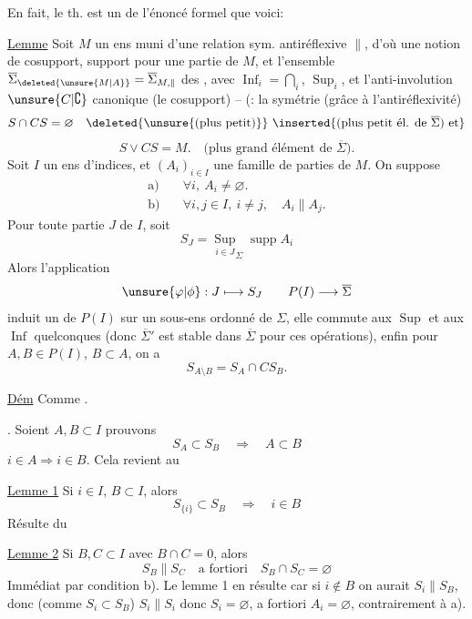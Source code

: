 En fait, le th. est un   de l'énoncé formel que voici:

\uline{Lemme} Soit $M$ un ens muni d'une relation sym. antiréflexive $\parallel$, d'où une notion de cosupport, support pour une partie de $M$, et l'ensemble $\overline\Sigma_{\deleted{\unsure{M|A}}}=\overline\Sigma_{M,\parallel}$ des , avec $\operatorname{Inf}_i=\bigcap_i$, $\operatorname{Sup}_i$, et l'anti-involution $\unsure{C|\complement}$ canonique (le cosupport) -- (: la symétrie   (grâce à l'antiréflexivité)
\[
S\cap CS=\varnothing\quad\deleted{\text{\unsure{(plus petit)}}}\ \inserted{\text{(plus petit él. de }\overline\Sigma\text{) et}}
\]
\[
S\vee CS=M.\quad\text{(plus grand élément de }\overline\Sigma\text{)}.
\]
Soit $I$ un ens d'indices, et $(A_i)_{i\in I}$ une famille de parties de $M$.  On suppose
\[
\begin{aligned}
\text{a)}\quad&\forall i,\ A_i\ne\varnothing.\\
\text{b)}\quad&\forall i,j\in I,\ i\ne j,\quad A_i\parallel A_j.
\end{aligned}
\]
Pour toute partie $J$ de $I$, soit
\[
S_J=\underset{i\in J}{\operatorname{Sup}}_{\Sigma}\operatorname{supp}A_i
\]
Alors l'application
\[
\unsure{\varphi|\phi}:J\longmapsto S_J\qquad P(I)\longrightarrow\overline\Sigma
\]
 induit un  de $P(I)$ sur un sous-ens ordonné  de $\Sigma$, elle commute aux $\operatorname{Sup}$ et aux $\operatorname{Inf}$ quelconques (donc $\overline\Sigma'$ est stable dans $\overline\Sigma$ pour ces opérations), enfin pour $A,B\in P(I)$, $B\subset A$, on a
\[
S_{A\setminus B}=S_A\cap CS_B.
\]

\uline{Dém} Comme .

. Soient $A,B\subset I$  prouvons
\[
S_A\subset S_B\quad\Rightarrow\quad A\subset B
\]
 $i\in A\Rightarrow i\in B$. Cela revient au 

\uline{Lemme 1} Si $i\in I$,  $B\subset I$, alors
\[
S_{\{i\}}\subset S_B\quad\Rightarrow\quad i\in B
\]
Résulte du

\uline{Lemme 2} Si  $B,C\subset I$ avec $B\cap C=0$, alors
\[
S_B\parallel S_C\quad\text{a fortiori}\quad S_B\cap S_C=\varnothing
\]
Immédiat par condition b). Le lemme 1 en résulte car si $i\notin B$ on aurait $S_i\parallel S_B$, donc (comme $S_i\subset S_B$) $S_i\parallel S_i$ donc $S_i=\varnothing$, a fortiori $A_i=\varnothing$, contrairement à a).

